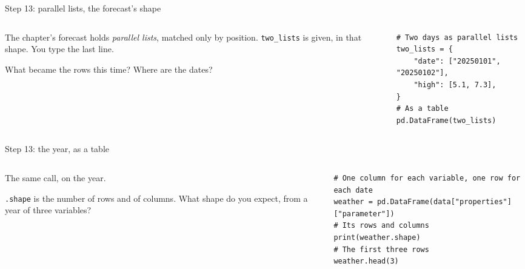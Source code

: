 \documentclass[9pt,aspectratio=169]{beamer}
\begin{document}
\begin{frame}[fragile]{Step 13: parallel lists, the forecast's shape}
    \begin{columns}[T]
        \begin{column}{0.37\textwidth}
            The chapter's forecast holds \textit{parallel lists}, matched only by position. \texttt{two\_lists} is given, in that shape. You type the last line.

            \medskip
            What became the rows this time? Where are the dates?
        \end{column}
        \begin{column}{0.6\textwidth}
\begin{lstlisting}
# Two days as parallel lists
two_lists = {
    "date": ["20250101", "20250102"],
    "high": [5.1, 7.3],
}
# As a table
pd.DataFrame(two_lists)
\end{lstlisting}
        \end{column}
    \end{columns}
\end{frame}

\begin{frame}[fragile]{Step 13: the year, as a table}
    \begin{columns}[T]
        \begin{column}{0.37\textwidth}
            The same call, on the year.

            \medskip
            \texttt{.shape} is the number of rows and of columns. What shape do you expect, from a year of three variables?
        \end{column}
        \begin{column}{0.6\textwidth}
\begin{lstlisting}
# One column for each variable, one row for each date
weather = pd.DataFrame(data["properties"]["parameter"])
# Its rows and columns
print(weather.shape)
# The first three rows
weather.head(3)
\end{lstlisting}
        \end{column}
    \end{columns}
\end{frame}
\end{document}
